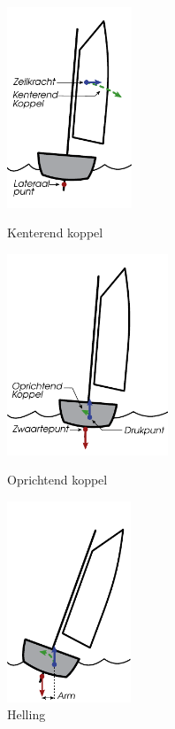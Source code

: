 \begin{figure}[H]
	\centering
	\begin{minipage}[b]{0.32\textwidth}
		\centering
		\includegraphics[height=6cm]{Hoofdstukken/Krachten/pdf/stabiliteit_kenternd.pdf}
		\caption{Kenterend koppel}
		\label{pic:kenterende_koppel}
	\end{minipage}
	\hfill
	\begin{minipage}[b]{0.33\textwidth}
		\centering
		\includegraphics[height=6cm]{Hoofdstukken/Krachten/pdf/stabiliteit_gewichtstabiel.pdf}
		\caption{Oprichtend koppel}
		\label{pic:oprichtend}
	\end{minipage}
	\hfill
	\begin{minipage}[b]{0.32\textwidth}
		\centering
		\includegraphics[height=6cm]{Hoofdstukken/Krachten/pdf/stabiliteit_gewichtstabiel_helling.pdf}
		\caption{Helling}
		\label{pic:oprichtend_helling}
	\end{minipage}
\end{figure}

